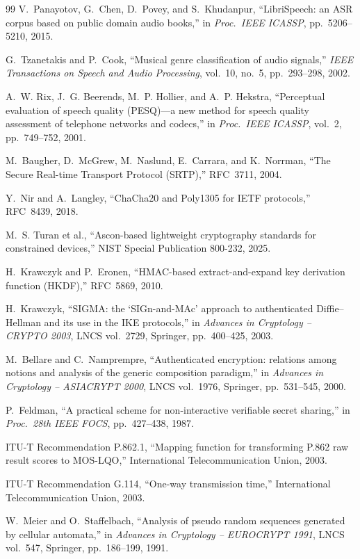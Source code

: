 \documentclass[pdflatex,sn-mathphys-num]{sn-jnl}%
\theoremstyle{thmstyleone}%
\theoremstyle{thmstyletwo}%
\theoremstyle{thmstylethree}%
\begin{document}
\begin{thebibliography}{99}
 V.~Panayotov, G.~Chen, D.~Povey, and S.~Khudanpur, ``LibriSpeech: an ASR corpus based on public domain audio books,'' in \textit{Proc.\ IEEE ICASSP}, pp.~5206--5210, 2015.

 G.~Tzanetakis and P.~Cook, ``Musical genre classification of audio signals,'' \textit{IEEE Transactions on Speech and Audio Processing}, vol.~10, no.~5, pp.~293--298, 2002.

 A.~W. Rix, J.~G. Beerends, M.~P. Hollier, and A.~P. Hekstra, ``Perceptual evaluation of speech quality (PESQ)---a new method for speech quality assessment of telephone networks and codecs,'' in \textit{Proc.\ IEEE ICASSP}, vol.~2, pp.~749--752, 2001.

 M.~Baugher, D.~McGrew, M.~Naslund, E.~Carrara, and K.~Norrman, ``The Secure Real-time Transport Protocol (SRTP),'' RFC~3711, 2004.

 Y.~Nir and A.~Langley, ``ChaCha20 and Poly1305 for IETF protocols,'' RFC~8439, 2018.

 M.~S. Turan et al., ``Ascon-based lightweight cryptography standards for constrained devices,'' NIST Special Publication 800-232, 2025.

 H.~Krawczyk and P.~Eronen, ``HMAC-based extract-and-expand key derivation function (HKDF),'' RFC~5869, 2010.

 H.~Krawczyk, ``SIGMA: the `SIGn-and-MAc' approach to authenticated Diffie--Hellman and its use in the IKE protocols,'' in \textit{Advances in Cryptology -- CRYPTO 2003}, LNCS vol.~2729, Springer, pp.~400--425, 2003.

 M.~Bellare and C.~Namprempre, ``Authenticated encryption: relations among notions and analysis of the generic composition paradigm,'' in \textit{Advances in Cryptology -- ASIACRYPT 2000}, LNCS vol.~1976, Springer, pp.~531--545, 2000.

 P.~Feldman, ``A practical scheme for non-interactive verifiable secret sharing,'' in \textit{Proc.\ 28th IEEE FOCS}, pp.~427--438, 1987.

 ITU-T Recommendation P.862.1, ``Mapping function for transforming P.862 raw result scores to MOS-LQO,'' International Telecommunication Union, 2003.

 ITU-T Recommendation G.114, ``One-way transmission time,'' International Telecommunication Union, 2003.

 W.~Meier and O.~Staffelbach, ``Analysis of pseudo random sequences generated by cellular automata,'' in \textit{Advances in Cryptology -- EUROCRYPT 1991}, LNCS vol.~547, Springer, pp.~186--199, 1991.
\end{thebibliography}
\end{document}
